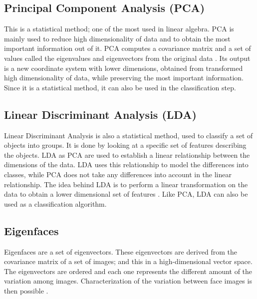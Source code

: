 \subsection{Principal Component Analysis (PCA)}

\vspace{\baselineskip}
\noindent This is a statistical method; one of the most used in linear algebra. PCA is mainly used to reduce high dimensionality of data and to obtain the most important information out of it. PCA computes a covariance matrix and a set of values called the eigenvalues and eigenvectors from the original data \cite{GAN08}. Its output is a new coordinate system with lower dimensions, obtained from transformed high dimensionality of data, while preserving the most important information.  Since it is a statistical method, it can also be used in the classification step.
\newline

\subsection{Linear Discriminant Analysis (LDA)}

\vspace{\baselineskip}
\noindent Linear Discriminant Analysis is also a statistical method, used to classify a set of objects into groups. It is done by looking at a specific set of features describing the objects. LDA as PCA are used to establish a linear relationship between the dimensions of the data. LDA uses this relationship to model the differences into classes, while PCA does not take any differences into account in the linear relationship. The idea behind LDA  is to perform a linear transformation on the data to obtain a lower dimensional set of features \cite{GAN08}. Like PCA, LDA can also be used as a classification algorithm.
\newline

\subsection{Eigenfaces}

\vspace{\baselineskip}
\noindent Eigenfaces are a set of eigenvectors. These eigenvectors are derived from the covariance matrix of a set of images; and this in a high-dimensional vector space. The eigenvectors are ordered and each one represents the different amount of the variation among images. Characterization of the variation between face images is then possible \cite{TUR91}.
\newline

